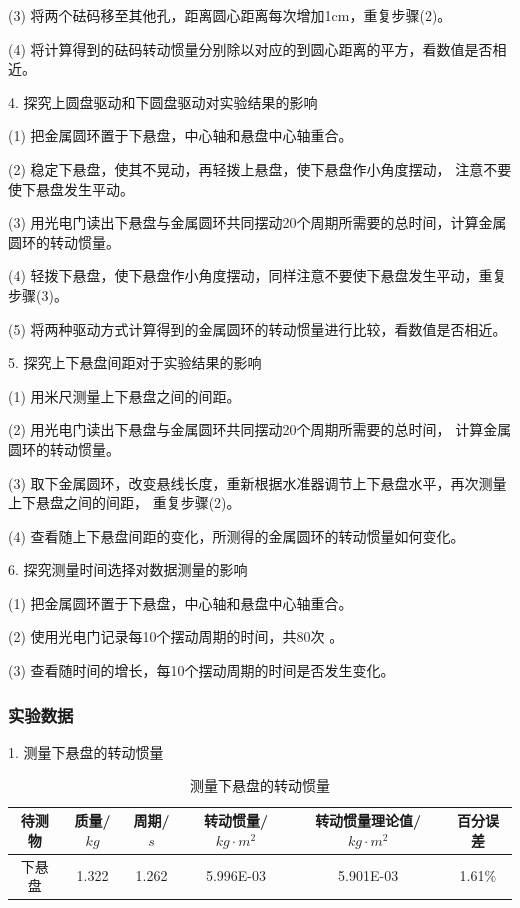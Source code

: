 \documentclass[12pt,hyperref,a4paper,UTF8]{ctexart}
\begin{document}
(3) 将两个砝码移至其他孔，距离圆心距离每次增加1cm，重复步骤(2)。

(4) 将计算得到的砝码转动惯量分别除以对应的到圆心距离的平方，看数值是否相近。

4. 探究上圆盘驱动和下圆盘驱动对实验结果的影响

(1) 把金属圆环置于下悬盘，中心轴和悬盘中心轴重合。

(2) 稳定下悬盘，使其不晃动，再轻拨上悬盘，使下悬盘作小角度摆动，
注意不要使下悬盘发生平动。

(3) 用光电门读出下悬盘与金属圆环共同摆动20个周期所需要的总时间，计算金属圆环的转动惯量。

(4) 轻拨下悬盘，使下悬盘作小角度摆动，同样注意不要使下悬盘发生平动，重复步骤(3)。

(5) 将两种驱动方式计算得到的金属圆环的转动惯量进行比较，看数值是否相近。

5. 探究上下悬盘间距对于实验结果的影响

(1) 用米尺测量上下悬盘之间的间距。

(2) 用光电门读出下悬盘与金属圆环共同摆动20个周期所需要的总时间，
计算金属圆环的转动惯量。

(3) 取下金属圆环，改变悬线长度，重新根据水准器调节上下悬盘水平，再次测量上下悬盘之间的间距，
重复步骤(2)。

(4) 查看随上下悬盘间距的变化，所测得的金属圆环的转动惯量如何变化。

6. 探究测量时间选择对数据测量的影响

(1) 把金属圆环置于下悬盘，中心轴和悬盘中心轴重合。

(2) 使用光电门记录每10个摆动周期的时间，共80次 。

(3) 查看随时间的增长，每10个摆动周期的时间是否发生变化。

\subsubsection{实验数据}

1. 测量下悬盘的转动惯量

\begin{table}[h!]
\centering
\begin{tabular}{|c|c|c|c|c|c|}
    \hline
      待测物 & 质量/$kg$ & 周期/$s$ & 转动惯量/$kg·m^2$ & 转动惯量理论值/$kg·m^2$ & 百分误差\\
    \hline
      下悬盘 & 1.322 & 1.262 & 5.996E-03 & 5.901E-03 & 1.61\% \\
    \hline
\end{tabular}
\caption{测量下悬盘的转动惯量}
\end{table}
\end{document}
